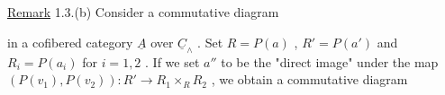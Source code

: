 \underline{Remark} 1.3.(b)    Consider a commutative diagram

\begin{center}
\end{center}
in a cofibered category  $\underline{A}$  over  $\underline{C}_{\wedge}$ . Set  $R = P(a)$ , $R' = P(a')$  and
$R_{i} = P(a_{i})$  for  $i = 1, 2$ . If we set  $a''$  to be the  "direct image"  under the
map  $(P(v_{1}),P(v_{2})) : R' \to R_{1} \times_{R} R_{2}$ , we obtain a commutative diagram

